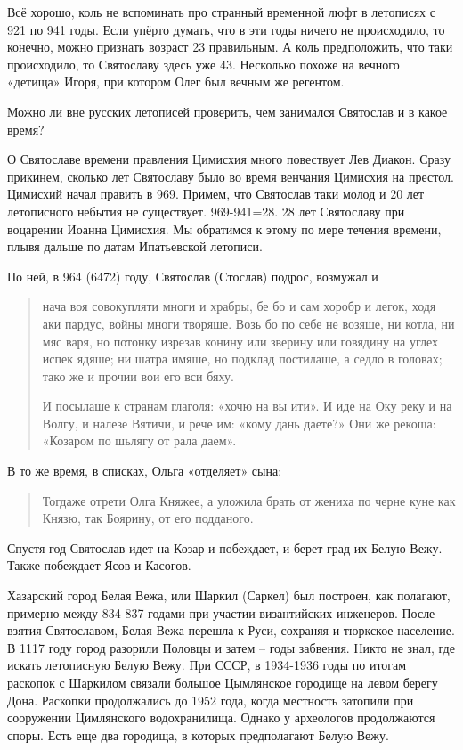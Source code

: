 Всё хорошо, коль не вспоминать про странный временной люфт в летописях с 921 по 941 годы. Если упёрто думать, что в эти годы ничего не происходило, то конечно, можно признать возраст 23 правильным. А коль предположить, что таки происходило, то Святославу здесь уже 43. Несколько похоже на вечного «детища» Игоря, при котором Олег был вечным же регентом.

Можно ли вне русских летописей проверить, чем занимался Святослав и в какое время? 

О Святославе времени правления Цимисхия много повествует Лев Диакон. Сразу прикинем, сколько лет Святославу было во время венчания Цимисхия на престол. Цимисхий начал править в 969. Примем, что Святослав таки молод и 20 лет летописного небытия не существует. 969-941=28. 28 лет Святославу при воцарении Иоанна Цимисхия. Мы обратимся к этому по мере течения времени, плывя дальше по датам Ипатьевской летописи.

По ней, в 964 (6472) году, Святослав (Стослав) подрос, возмужал и 

\begin{quotation}
нача воя совокупляти многи и храбры, бе бо и сам хоробр и легок, ходя аки пардус, войны многи творяше. Возь бо по себе не возяше, ни котла, ни мяс варя, но потонку изрезав конину или зверину или говядину на углех испек ядяше; ни шатра имяше, но подклад постилаше, а седло в головах; тако же и прочии вои его вси бяху.

И посылаше к странам глаголя: «хочю на вы ити». И иде на Оку реку и на Волгу, и налезе Вятичи, и рече им: «кому дань даете?» Они же рекоша: «Козаром по шьлягу от рала даем».
\end{quotation}

В то же время, в списках, Ольга «отделяет» сына:

\begin{quotation}
Тогдаже отрети Олга Княжее, а уложила брать от жениха по черне куне как Князю, так Боярину, от его подданого.
\end{quotation}

Спустя год Святослав идет на Козар и побеждает, и берет град их Белую Вежу. Также побеждает Ясов и Касогов.

Хазарский город Белая Вежа, или Шаркил (Саркел) был построен, как полагают, примерно между 834-837 годами при участии византийских инженеров. После взятия Святославом, Белая Вежа перешла к Руси, сохраняя и тюркское население. В 1117 году город разорили Половцы и затем – годы забвения. Никто не знал, где искать летописную Белую Вежу. При СССР, в 1934-1936 годы по итогам раскопок с Шаркилом связали большое Цымлянское городище на левом берегу Дона. Раскопки продолжались до 1952 года, когда местность затопили при сооружении Цимлянского водохранилища. Однако у археологов продолжаются споры. Есть еще два городища, в которых предполагают Белую Вежу.

